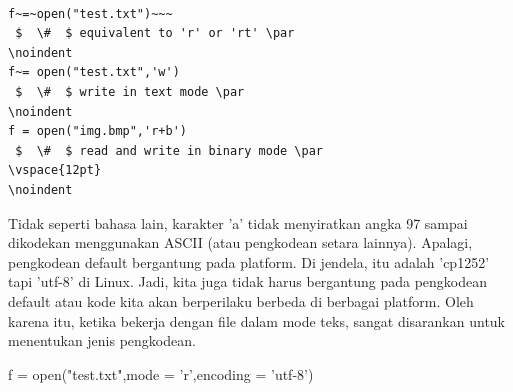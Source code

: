 \begin{verbatim}

f~=~open("test.txt")~~~   
 $  \#  $ equivalent to 'r' or 'rt' \par
\noindent 
f~= open("test.txt",'w')  
 $  \#  $ write in text mode \par
\noindent 
f = open("img.bmp",'r+b') 
 $  \#  $ read and write in binary mode \par
\vspace{12pt}
\noindent 

\end{verbatim}

Tidak seperti bahasa lain, karakter 'a' tidak menyiratkan angka 97 sampai dikodekan menggunakan ASCII (atau pengkodean setara lainnya). Apalagi, pengkodean default bergantung pada platform. Di jendela, itu adalah 'cp1252' tapi 'utf-8' di Linux. Jadi, kita juga tidak harus bergantung pada pengkodean default atau kode kita akan berperilaku berbeda di berbagai platform. Oleh karena itu, ketika bekerja dengan file dalam mode teks, sangat disarankan untuk menentukan jenis pengkodean. \par
\vspace{12pt}
\noindent 
f = open("test.txt",mode = 'r',encoding = 'utf-8') \par
\vspace{12pt}
\noindent 
